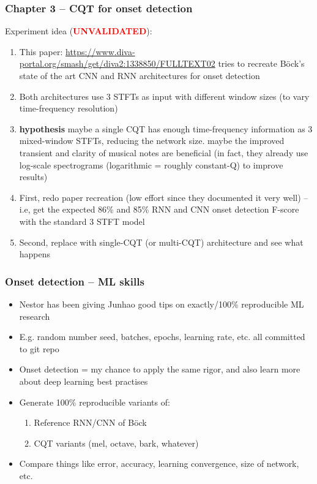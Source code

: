 \documentclass[usenames,dvipsnames]{beamer}
\begin{document}
\begin{frame}
	\frametitle{Chapter 3 -- CQT for onset detection}
	Experiment idea (\textcolor{red}{\textbf{UNVALIDATED}}):
	\begin{enumerate}
		\item
			This paper: \href{https://www.diva-portal.org/smash/get/diva2:1338850/FULLTEXT02}{https://www.diva-portal.org/smash/get/diva2:1338850/FULLTEXT02} tries to recreate B{\"o}ck's state of the art CNN and RNN architectures for onset detection
		\item
			Both architectures use 3 STFTs as input with different window sizes (to vary time-frequency resolution)
		\item
			\textbf{hypothesis} maybe a single CQT has enough time-frequency information as 3 mixed-window STFTs, reducing the network size. maybe the improved transient and clarity of musical notes are beneficial (in fact, they already use log-scale spectrograms (logarithmic = roughly constant-Q) to improve results)
		\item
			First, redo paper recreation (low effort since they documented it very well) -- i.e, get the expected 86\% and 85\% RNN and CNN onset detection F-score with the standard 3 STFT model
		\item
			Second, replace with single-CQT (or multi-CQT) architecture and see what happens
	\end{enumerate}
\end{frame}

\begin{frame}
	\frametitle{Onset detection -- ML skills}
	\begin{itemize}
		\item
			Nestor has been giving Junhao good tips on exactly/100\% reproducible ML research
		\item
			E.g. random number seed, batches, epochs, learning rate, etc. all committed to git repo
		\item
			Onset detection = my chance to apply the same rigor, and also learn more about deep learning best practises
		\item
			Generate 100\% reproducible variants of:
			\begin{enumerate}
				\item
					Reference RNN/CNN of B{\"o}ck
				\item
					CQT variants (mel, octave, bark, whatever)
			\end{enumerate}
		\item
			Compare things like error, accuracy, learning convergence, size of network, etc.
	\end{itemize}
\end{frame}
\end{document}
